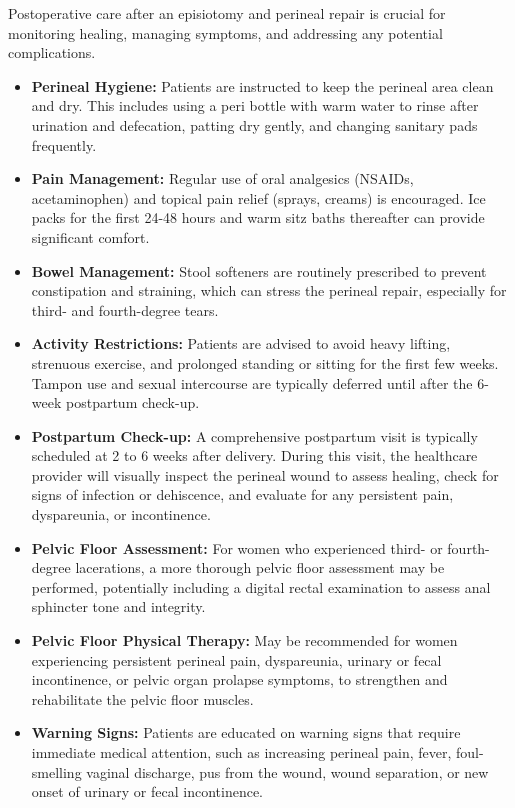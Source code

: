 Postoperative care after an episiotomy and perineal repair is crucial for monitoring healing, managing symptoms, and addressing any potential complications.

\begin{itemize}
  \item \textbf{Perineal Hygiene:} Patients are instructed to keep the perineal area clean and dry. This includes using a peri bottle with warm water to rinse after urination and defecation, patting dry gently, and changing sanitary pads frequently.
  \item \textbf{Pain Management:} Regular use of oral analgesics (NSAIDs, acetaminophen) and topical pain relief (sprays, creams) is encouraged. Ice packs for the first 24-48 hours and warm sitz baths thereafter can provide significant comfort.
  \item \textbf{Bowel Management:} Stool softeners are routinely prescribed to prevent constipation and straining, which can stress the perineal repair, especially for third- and fourth-degree tears.
  \item \textbf{Activity Restrictions:} Patients are advised to avoid heavy lifting, strenuous exercise, and prolonged standing or sitting for the first few weeks. Tampon use and sexual intercourse are typically deferred until after the 6-week postpartum check-up.
  \item \textbf{Postpartum Check-up:} A comprehensive postpartum visit is typically scheduled at 2 to 6 weeks after delivery. During this visit, the healthcare provider will visually inspect the perineal wound to assess healing, check for signs of infection or dehiscence, and evaluate for any persistent pain, dyspareunia, or incontinence.
  \item \textbf{Pelvic Floor Assessment:} For women who experienced third- or fourth-degree lacerations, a more thorough pelvic floor assessment may be performed, potentially including a digital rectal examination to assess anal sphincter tone and integrity.
  \item \textbf{Pelvic Floor Physical Therapy:} May be recommended for women experiencing persistent perineal pain, dyspareunia, urinary or fecal incontinence, or pelvic organ prolapse symptoms, to strengthen and rehabilitate the pelvic floor muscles.
  \item \textbf{Warning Signs:} Patients are educated on warning signs that require immediate medical attention, such as increasing perineal pain, fever, foul-smelling vaginal discharge, pus from the wound, wound separation, or new onset of urinary or fecal incontinence.
\end{itemize}

